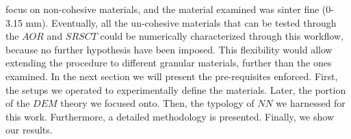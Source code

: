 focus on non-cohesive materials, and the material examined was sinter fine
(0-3.15 mm).
Eventually, all the un-cohesive materials that can be tested through the $AOR$
and $SRSCT$ could be numerically characterized through this workflow, because no
further hypothesis have been imposed.
This flexibility would allow extending the procedure to different granular materials, further than the ones examined.
In the next section we will present the pre-requisites enforced. 
First, the setups we operated to experimentally define the materials. 
Later, the portion of the $DEM$ theory we focused onto. 
Then, the typology of $NN$ we harnessed for this work. 
Furthermore, a detailed methodology is presented. Finally, we show our results.


